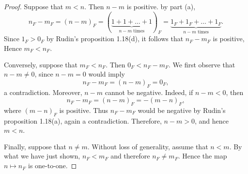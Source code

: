 \documentclass[../../../main.tex]{subfiles}
\begin{document}

\begin{proof}
	Suppose that $m < n$.
	Then $n - m$ is positive.
	by part (a),
	\[ 
		n_F - m_F = (n - m)_F = (\underbrace{1 + 1 + \ldots + 1}_{n - m \text{ times}})_F = \underbrace{1_F + 1_F + \ldots + 1_F}_{n - m \text{ times}}.
	 \]
	Since $1_F > 0_F$ by Rudin's proposition 1.18(d),
	it follows that $n_F - m_F$ is positive, Hence $m_F < n_F$.

	Conversely, suppose that $m_F < n_F$.
	Then $0_F < n_F - m_F$.
	We first observe that $n - m \neq 0$, since $n - m = 0$ would imply
	\[ 
		n_F - m_F = (n - m)_F = 0_F,
	 \]
	a contradiction.
	Moreover, $n - m$ cannot be negative. Indeed, if $n - m < 0$, then
	\[ 
		n_F - m_F = (n - m)_F = -(m - n)_F,
	 \]
	where $(m - n)_F$ is positive. Thus $n_F - m_F$ would be negative by Rudin's proposition 1.18(a), again a contradiction.
	Therefore, $n - m > 0$, and hence $m < n$.

	Finally, suppose that $n \neq m$. Without loss of generality, assume that $n < m$.
	By what we have just shown, $n_F < m_F$ and therefore $n_F \neq m_F$.
	Hence the map $n \mapsto n_F$ is one-to-one.

\end{proof}
\end{document}
